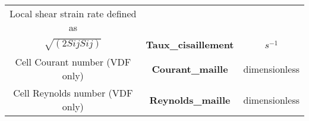 \begin{longtable}[hcr]{|c|c|c|}
Local shear strain rate defined as              &                                           & \\
$\sqrt{(2SijSij)}$                              & \textbf{Taux\_cisaillement}               & $s^{-1}$ \\ \hline
Cell Courant number (VDF only)                  & \textbf{Courant\_maille}                  & dimensionless \\ \hline
Cell Reynolds number (VDF only)                 & \textbf{Reynolds\_maille}                 & dimensionless \\ \hline
\end{longtable}

